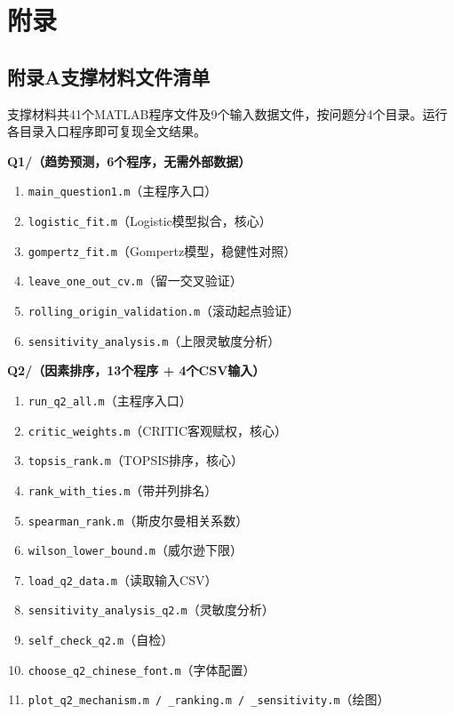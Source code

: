 ﻿%

\section*{附录}

\subsection*{附录A\quad 支撑材料文件清单}

支撑材料共41个MATLAB程序文件及9个输入数据文件，按问题分4个目录。运行各目录入口程序即可复现全文结果。

\vspace{0.3em}
\noindent\textbf{Q1/（趋势预测，6个程序，无需外部数据）}
\begin{enumerate}[leftmargin=2em,itemsep=0pt]
  \item \texttt{main\_question1.m}（主程序入口）
  \item \texttt{logistic\_fit.m}（Logistic模型拟合，核心）
  \item \texttt{gompertz\_fit.m}（Gompertz模型，稳健性对照）
  \item \texttt{leave\_one\_out\_cv.m}（留一交叉验证）
  \item \texttt{rolling\_origin\_validation.m}（滚动起点验证）
  \item \texttt{sensitivity\_analysis.m}（上限灵敏度分析）
\end{enumerate}

\vspace{0.2em}
\noindent\textbf{Q2/（因素排序，13个程序 + 4个CSV输入）}
\begin{enumerate}[leftmargin=2em,itemsep=0pt]
  \item \texttt{run\_q2\_all.m}（主程序入口）
  \item \texttt{critic\_weights.m}（CRITIC客观赋权，核心）
  \item \texttt{topsis\_rank.m}（TOPSIS排序，核心）
  \item \texttt{rank\_with\_ties.m}（带并列排名）
  \item \texttt{spearman\_rank.m}（斯皮尔曼相关系数）
  \item \texttt{wilson\_lower\_bound.m}（威尔逊下限）
  \item \texttt{load\_q2\_data.m}（读取输入CSV）
  \item \texttt{sensitivity\_analysis\_q2.m}（灵敏度分析）
  \item \texttt{self\_check\_q2.m}（自检）
  \item \texttt{choose\_q2\_chinese\_font.m}（字体配置）
  \item \texttt{plot\_q2\_mechanism.m / \_ranking.m / \_sensitivity.m}（绘图）
\end{enumerate}

